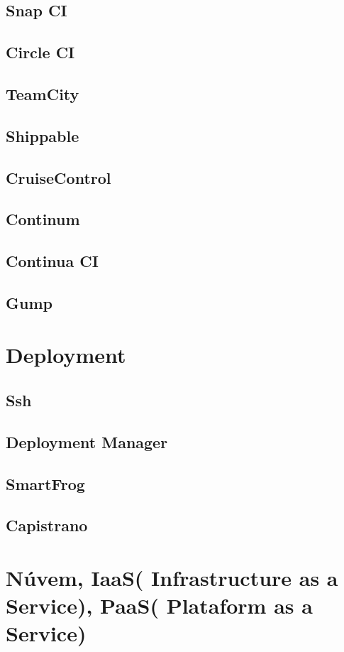 	\subsection{Snap CI}
	\subsection{Circle CI}
	\subsection{TeamCity}
	\subsection{Shippable}
	\subsection{CruiseControl}
	\subsection{Continum}
	\subsection{Continua CI}
	\subsection{Gump}

    \section{Deployment}

	\subsection{Ssh}
	\subsection{Deployment Manager}
	\subsection{SmartFrog}
	\subsection{Capistrano}

    \section{Núvem, IaaS( Infrastructure as a Service), PaaS( Plataform as a Service)}


